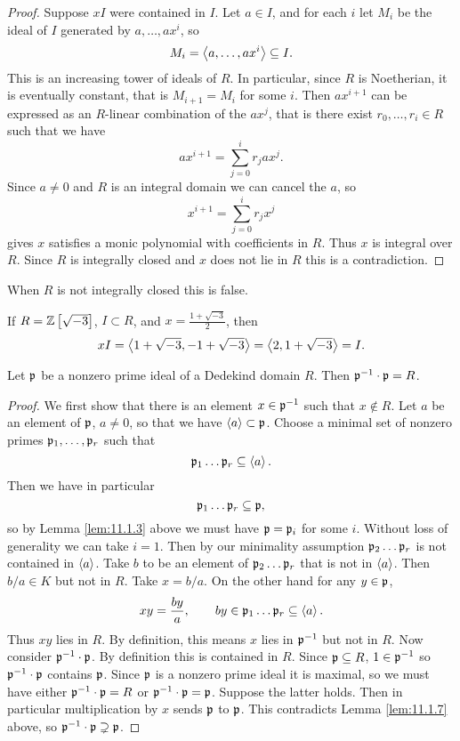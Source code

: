 \begin{proof}
Suppose $ xI $ were contained in $ I $. Let $ a \in I $, and for each $ i $ let $ M_i $ be the ideal of $ I $ generated by $ a, \dots, ax^i $, so
$$ M_i = \left\langle a, \dots, ax^i \right\rangle \subseteq I. $$
This is an increasing tower of ideals of $ R $. In particular, since $ R $ is Noetherian, it is eventually constant, that is $ M_{i + 1} = M_i $ for some $ i $. Then $ ax^{i + 1} $ can be expressed as an $ R $-linear combination of the $ ax^j $, that is there exist $ r_0, \dots, r_i \in R $ such that we have
$$ ax^{i + 1} = \sum_{j = 0}^i r_jax^j. $$
Since $ a \ne 0 $ and $ R $ is an integral domain we can cancel the $ a $, so
$$ x^{i + 1} = \sum_{j = 0}^i r_jx^j $$
gives $ x $ satisfies a monic polynomial with coefficients in $ R $. Thus $ x $ is integral over $ R $. Since $ R $ is integrally closed and $ x $ does not lie in $ R $ this is a contradiction.
\end{proof}

When $ R $ is not integrally closed this is false.

\begin{example*}
If $ R = \mathbb{Z}\left[ \sqrt{-3} \right] $, $ I \subset R $, and $ x = \tfrac{1 + \sqrt{-3}}{2} $, then
$$ xI = \left\langle 1 + \sqrt{-3}, -1 + \sqrt{-3} \right\rangle = \left\langle 2, 1 + \sqrt{-3} \right\rangle = I. $$
\end{example*}

\begin{proposition}
\label{prop:11.1.8}
Let $ \mathfrak{p} $ be a nonzero prime ideal of a Dedekind domain $ R $. Then $ \mathfrak{p}^{-1} \cdot \mathfrak{p} = R $.
\end{proposition}

\begin{proof}
We first show that there is an element $ x \in \mathfrak{p}^{-1} $ such that $ x \notin R $. Let $ a $ be an element of $ \mathfrak{p} $, $ a \ne 0 $, so that we have $ \left\langle a \right\rangle \subset \mathfrak{p} $. Choose a minimal set of nonzero primes $ \mathfrak{p}_1, \dots, \mathfrak{p}_r $ such that
$$ \mathfrak{p}_1 \dots \mathfrak{p}_r \subseteq \left\langle a \right\rangle. $$
Then we have in particular
$$ \mathfrak{p}_1 \dots \mathfrak{p}_r \subseteq \mathfrak{p}, $$
so by Lemma \ref{lem:11.1.3} above we must have $ \mathfrak{p} = \mathfrak{p}_i $ for some $ i $. Without loss of generality we can take $ i = 1 $. Then by our minimality assumption $ \mathfrak{p}_2 \dots \mathfrak{p}_r $ is not contained in $ \left\langle a \right\rangle $. Take $ b $ to be an element of $ \mathfrak{p}_2 \dots \mathfrak{p}_r $ that is not in $ \left\langle a \right\rangle $. Then $ b / a \in K $ but not in $ R $. Take $ x = b / a $. On the other hand for any $ y \in \mathfrak{p} $,
$$ xy = \dfrac{by}{a}, \qquad by \in \mathfrak{p}_1 \dots \mathfrak{p}_r \subseteq \left\langle a \right\rangle. $$
Thus $ xy $ lies in $ R $. By definition, this means $ x $ lies in $ \mathfrak{p}^{-1} $ but not in $ R $. Now consider $ \mathfrak{p}^{-1} \cdot \mathfrak{p} $. By definition this is contained in $ R $. Since $ \mathfrak{p} \subseteq R $, $ 1 \in \mathfrak{p}^{-1} $ so $ \mathfrak{p}^{-1} \cdot \mathfrak{p} $ contains $ \mathfrak{p} $. Since $ \mathfrak{p} $ is a nonzero prime ideal it is maximal, so we must have either $ \mathfrak{p}^{-1} \cdot \mathfrak{p} = R $ or $ \mathfrak{p}^{-1} \cdot \mathfrak{p} = \mathfrak{p} $. Suppose the latter holds. Then in particular multiplication by $ x $ sends $ \mathfrak{p} $ to $ \mathfrak{p} $. This contradicts Lemma \ref{lem:11.1.7} above, so $ \mathfrak{p}^{-1} \cdot \mathfrak{p} \supsetneq \mathfrak{p} $.
\end{proof}

